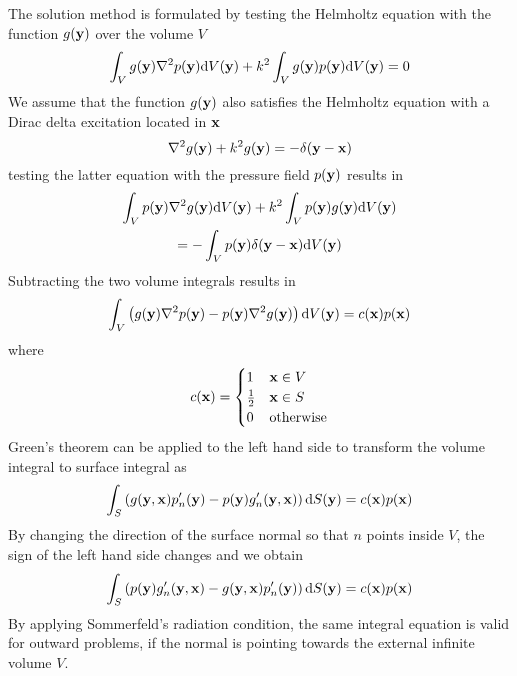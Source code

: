 \documentclass[10pt,onecolumn]{article}
\newcommand{\td}{\mathrm{d}}
\begin{document}
The solution method is formulated by testing the Helmholtz equation with the function $g({\bf y})$ over the volume $V$
%
\begin{equation}
\int_V g({\bf y}) \nabla^2 p({\bf y}) \td V({\bf y})
+ k^2 \int_V g({\bf y}) p({\bf y})  \td V({\bf y}) = 0
\end{equation}
%
We assume that the function $g({\bf y})$ also satisfies the Helmholtz equation with a Dirac delta excitation located in ${\bf x}$
%
\begin{equation}
\nabla^2 g({\bf y}) + k^2 g({\bf y}) = -\delta({\bf y}-{\bf x})
\end{equation}
%
testing the latter equation with the pressure field $p({\bf y})$ results in
%
\begin{multline}
\int_V  p({\bf y}) \nabla^2 g({\bf y}) \td V({\bf y})
+ k^2 \int_V p({\bf y}) g({\bf y})  \td V({\bf y}) \\
= -\int_V p({\bf y})  \delta({\bf y}-{\bf x}) \td V({\bf y})
\end{multline}
%
Subtracting the two volume integrals results in
%
\begin{equation}
\int_V \left(g({\bf y}) \nabla^2 p({\bf y}) - p({\bf y}) \nabla^2 g({\bf y})\right) \td V({\bf y})
= c({\bf x})p({\bf x})
\end{equation}
%
where
%
\begin{equation}
c({\bf x}) = \begin{cases}
1 & {\bf x} \in V \\
\frac{1}{2} & {\bf x} \in S \\
0 &  \text{otherwise}
\end{cases}
\end{equation}
%
Green's theorem can be applied to the left hand side to transform the volume integral to surface integral as
%
\begin{equation}
\int_S \left(g({\bf y}, {\bf x}) p'_n({\bf y}) - p({\bf y}) g'_n({\bf y}, {\bf x})\right) \td S({\bf y})
= c({\bf x})p({\bf x})
\end{equation}
%
By changing the direction of the surface normal so that $n$ points inside $V$, the sign of the left hand side changes and we obtain
%
\begin{equation}
\int_S \left(p({\bf y}) g'_n({\bf y}, {\bf x}) - g({\bf y}, {\bf x}) p'_n({\bf y})\right) \td S({\bf y})
= c({\bf x}) p({\bf x})
\end{equation}
%
By applying Sommerfeld's radiation condition, the same integral equation is valid for outward problems, if the normal is pointing towards the external infinite volume $V$.
\end{document}
